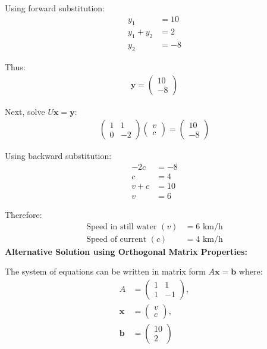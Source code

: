 \documentclass[journal]{IEEEtran}
\begin{document}
Using forward substitution:
\begin{align*}
    y_1 &= 10 \\
    y_1 + y_2 &= 2 \\
    y_2 &= -8
\end{align*}

Thus:
\begin{align*}
    \mathbf{y} = \begin{pmatrix}
    10 \\
    -8
    \end{pmatrix}
\end{align*}

Next, solve $U\mathbf{x} = \mathbf{y}$:
\begin{align*}
    \begin{pmatrix}
    1 & 1 \\
    0 & -2
    \end{pmatrix}
    \begin{pmatrix}
    v \\
    c
    \end{pmatrix} =
    \begin{pmatrix}
    10 \\
    -8
    \end{pmatrix}
\end{align*}

Using backward substitution:
\begin{align*}
    -2c &= -8 \\
    c &= 4 \\
    v + c &= 10 \\
    v &= 6
\end{align*}

Therefore:
\begin{align*}
    \text{Speed in still water } (v) &= 6 \text{ km/h} \\
    \text{Speed of current } (c) &= 4 \text{ km/h}
\end{align*}
\textbf{Alternative Solution using Orthogonal Matrix Properties:}

The system of equations can be written in matrix form $A\mathbf{x} = \mathbf{b}$ where:
\begin{align*}
A &= \begin{pmatrix}
1 & 1 \\
1 & -1
\end{pmatrix}, \\
\mathbf{x} &= \begin{pmatrix}
v \\
c
\end{pmatrix}, \\
\mathbf{b} &= \begin{pmatrix}
10 \\
2
\end{pmatrix}
\end{align*}
\end{document}
